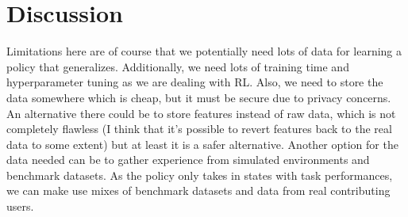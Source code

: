 \section{Discussion}



 Limitations here are of course that we potentially need lots of data for learning a policy that generalizes. Additionally, we need lots of training time and hyperparameter tuning as we are dealing with RL. Also, we need to store the data somewhere which is cheap, but it must be secure due to privacy concerns. An alternative there could be to store features instead of raw data, which is not completely flawless (I think that it's possible to revert features back to the real data to some extent) but at least it is a safer alternative. Another option for the data needed can be to gather experience from simulated environments and benchmark datasets. As the policy only takes in states with task performances, we can make use mixes of benchmark datasets and data from real contributing users. 

